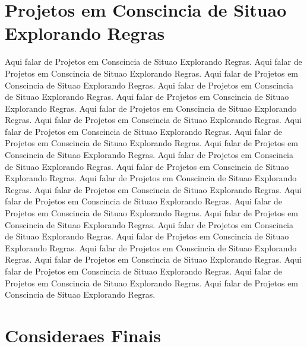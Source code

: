 \documentclass[12pt,a4paper,compsoc]{IEEEtran}
\begin{document}
\section{Projetos em Conscincia de Situao Explorando Regras}

Aqui falar de Projetos em Conscincia de Situao Explorando Regras. Aqui falar de Projetos em Conscincia de Situao Explorando Regras. Aqui falar de Projetos em Conscincia de Situao Explorando Regras. Aqui falar de Projetos em Conscincia de Situao Explorando Regras. Aqui falar de Projetos em Conscincia de Situao Explorando Regras. Aqui falar de Projetos em Conscincia de Situao Explorando Regras.
Aqui falar de Projetos em Conscincia de Situao Explorando Regras. Aqui falar de Projetos em Conscincia de Situao Explorando Regras. Aqui falar de Projetos em Conscincia de Situao Explorando Regras. Aqui falar de Projetos em Conscincia de Situao Explorando Regras. Aqui falar de Projetos em Conscincia de Situao Explorando Regras. Aqui falar de Projetos em Conscincia de Situao Explorando Regras.
Aqui falar de Projetos em Conscincia de Situao Explorando Regras. Aqui falar de Projetos em Conscincia de Situao Explorando Regras. Aqui falar de Projetos em Conscincia de Situao Explorando Regras. Aqui falar de Projetos em Conscincia de Situao Explorando Regras. Aqui falar de Projetos em Conscincia de Situao Explorando Regras. Aqui falar de Projetos em Conscincia de Situao Explorando Regras.
Aqui falar de Projetos em Conscincia de Situao Explorando Regras. Aqui falar de Projetos em Conscincia de Situao Explorando Regras. Aqui falar de Projetos em Conscincia de Situao Explorando Regras. Aqui falar de Projetos em Conscincia de Situao Explorando Regras. Aqui falar de Projetos em Conscincia de Situao Explorando Regras. Aqui falar de Projetos em Conscincia de Situao Explorando Regras.


\section{Consideraes Finais}
\end{document}
